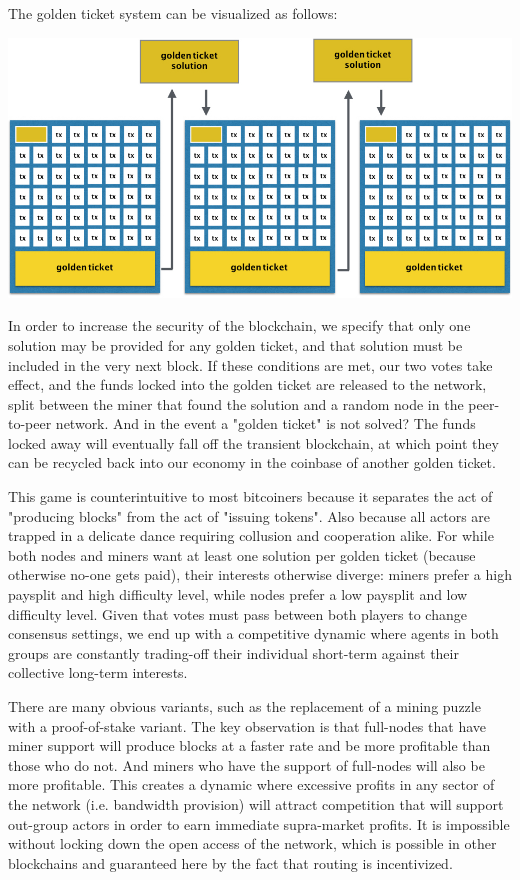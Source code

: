\documentclass[12pt, oneside]{article}   	%
\begin{document}
\begin{multicols}{2}
The golden ticket system can be visualized as follows:

\includegraphics[width=.45\textwidth]{saito7.jpeg}

In order to increase the security of the blockchain, we specify that only one solution may be provided for any golden ticket, and that solution must be included in the very next block. If these conditions are met, our two votes take effect, and the funds locked into the golden ticket are released to the network, split between the miner that found the solution and a random node in the peer-to-peer network. And in the event a "golden ticket" is not solved? The funds locked away will eventually fall off the transient blockchain, at which point they can be recycled back into our economy in the coinbase of another golden ticket. 

This game is counterintuitive to most bitcoiners because it separates the act of "producing blocks" from the act of "issuing tokens". Also because all actors are trapped in a delicate dance requiring collusion and cooperation alike. For while both nodes and miners want at least one solution per golden ticket (because otherwise no-one gets paid), their interests otherwise diverge: miners prefer a high paysplit and high difficulty level, while nodes prefer a low paysplit and low difficulty level. Given that votes must pass between both players to change consensus settings, we end up with a competitive dynamic where agents in both groups are constantly trading-off their individual short-term against their collective long-term interests.

There are many obvious variants, such as the replacement of a mining puzzle with a proof-of-stake variant. The key observation is that full-nodes that have miner support will produce blocks at a faster rate and be more profitable than those who do not. And miners who have the support of full-nodes will also be more profitable. This creates a dynamic where excessive profits in any sector of the network (i.e. bandwidth provision) will attract competition that will support out-group actors in order to earn immediate supra-market profits. It is impossible without locking down the open access of the network, which is possible in other blockchains and guaranteed here by the fact that routing is incentivized.


\end{multicols}
\end{document}
